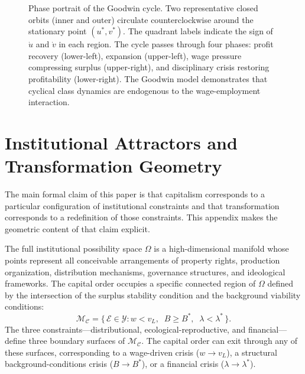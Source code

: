 \documentclass[12pt,a4paper]{article}
\theoremstyle{definition}
\theoremstyle{remark}
\begin{document}
\begin{figure}[ht]
\caption{Phase portrait of the Goodwin cycle. Two representative closed orbits (inner and outer) circulate counterclockwise around the stationary point $(u^*, v^*)$. The quadrant labels indicate the sign of $\dot u$ and $\dot v$ in each region. The cycle passes through four phases: profit recovery (lower-left), expansion (upper-left), wage pressure compressing surplus (upper-right), and disciplinary crisis restoring profitability (lower-right). The Goodwin model demonstrates that cyclical class dynamics are endogenous to the wage-employment interaction.}
\label{fig:goodwin_phase}
\end{figure}

\section{Institutional Attractors and Transformation Geometry}
\label{app:attractors}

The main formal claim of this paper is that capitalism corresponds to a particular configuration of institutional constraints and that transformation corresponds to a redefinition of those constraints. This appendix makes the geometric content of that claim explicit.

The full institutional possibility space $\Omega$ is a high-dimensional manifold whose points represent all conceivable arrangements of property rights, production organization, distribution mechanisms, governance structures, and ideological frameworks. The capital order occupies a specific connected region of $\Omega$ defined by the intersection of the surplus stability condition and the background viability conditions:
\begin{equation}
  \mathcal{M}_\mathcal{C} = \bigl\{\, \mathcal{E} \in \mathcal{Y} : w < v_L,\;\; B \geq B^*,\;\; \lambda < \lambda^* \,\bigr\}.
\end{equation}
The three constraints---distributional, ecological-reproductive, and financial---define three boundary surfaces of $\mathcal{M}_\mathcal{C}$. The capital order can exit through any of these surfaces, corresponding to a wage-driven crisis ($w \to v_L$), a structural background-conditions crisis ($B \to B^*$), or a financial crisis ($\lambda \to \lambda^*$).
\end{document}
